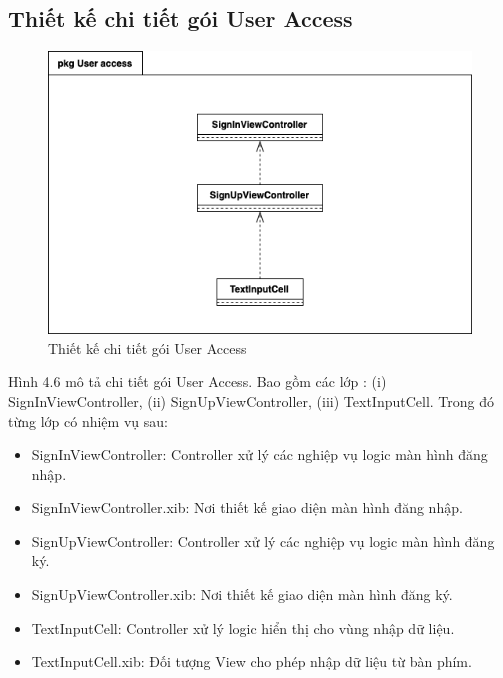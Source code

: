 \documentclass[../DoAn.tex]{subfiles}
\begin{document}
\subsection{Thiết kế chi tiết gói User Access} 
\begin{figure}[H]
    \centering
    \includegraphics[width=0.9\linewidth]{Hinhve/Package/UserAccess_Package_Detail_iOS_Client.png}
    \caption{Thiết kế chi tiết gói User Access}
    \label{fig:use_case_tổng_quan}
\end{figure}
Hình 4.6 mô tả chi tiết gói User Access. Bao gồm các lớp : (i) SignInViewController, (ii) SignUpViewController, (iii) TextInputCell. Trong đó từng lớp có nhiệm vụ sau:
\begin{itemize}
    \item SignInViewController: Controller xử lý các nghiệp vụ logic màn hình đăng nhập.
    \item SignInViewController.xib: Nơi thiết kế giao diện màn hình đăng nhập.
    \item SignUpViewController: Controller xử lý các nghiệp vụ logic màn hình đăng ký.
    \item SignUpViewController.xib: Nơi thiết kế giao diện màn hình đăng ký.
    \item TextInputCell: Controller xử lý logic hiển thị cho vùng nhập dữ liệu.
    \item TextInputCell.xib: Đối tượng View cho phép nhập dữ liệu từ bàn phím.
\end{itemize} \newpage
\end{document}
